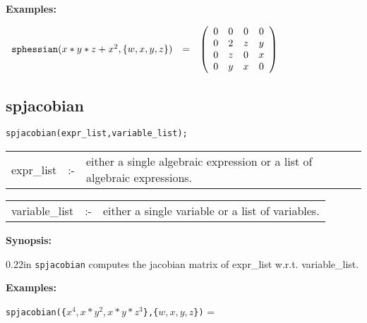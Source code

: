 {\bf Examples:}

\begin{flushleft}  
\hspace*{0.1in}
\begin{math}        
\begin{array}{ccc}
{\tt sphessian}(x*y*z+x^2,\{w,x,y,z\}) & = & 
\left( \begin{array}{cccc} 0 & 0 & 0 & 0 \\ 0 & 2 & z & y \\ 0 & z & 0 
& x \\ 0 & y & x & 0
\end{array} \right)
\end{array}
\end{math}  
\end{flushleft}


\subsection{spjacobian}

\hspace*{0.175in} {\tt spjacobian(expr\_list,variable\_list);}

\hspace*{0.1in} 
\begin{tabular}{l l l}
expr\_list   \hspace*{0.175in}  &:-& \parbox[t]{.72\linewidth}{either a 
single algebraic expression or a list of algebraic expressions.} 
\end{tabular}

\vspace*{0.04in}
\hspace*{0.1in}
\begin{tabular}{l l l}
variable\_list &:-& either a single variable or a list of variables.
\end{tabular}

{\bf Synopsis:} 

\begin{addtolength}{\leftskip}{0.22in}
{\tt spjacobian} computes the jacobian matrix of expr\_list w.r.t. 
variable\_list. 

\end{addtolength}

{\bf Examples:}

\hspace*{0.175in} 
{\tt spjacobian(\{$x^4,x*y^2,x*y*z^3$\},\{$w,x,y,z$\})} = 

\vspace*{0.1in}

